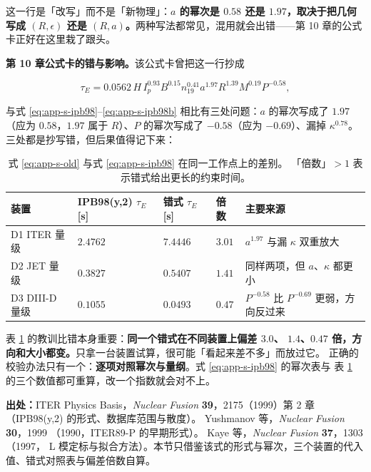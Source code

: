 这一行是「改写」而不是「新物理」：\textbf{$a$ 的幂次是 $0.58$ 还是 $1.97$，取决于把几何写成
$(R,\epsilon)$ 还是 $(R,a)$。}两种写法都常见，混用就会出错——第 10 章的公式卡正好在这里栽了跟头。

\textbf{第 10 章公式卡的错与影响。}该公式卡曾把这一行抄成

\begin{equation}
\tau_E=0.0562\,H\,I_p^{0.93}B^{0.15}n_{19}^{0.41}a^{1.97}R^{1.39}M^{0.19}P^{-0.58},
\label{eq:app-s-old}
\end{equation}

与式 \eqref{eq:app-s-ipb98}--\eqref{eq:app-s-ipb98b} 相比有三处问题：$a$ 的幂次写成了 $1.97$
（应为 $0.58$，$1.97$ 属于 $R$）、$P$ 的幂次写成了 $-0.58$（应为 $-0.69$）、漏掉 $\kappa^{0.78}$。
三处都是抄写错，但后果值得记下来：

\begin{table}[htbp]
  \centering
  \caption{式 \eqref{eq:app-s-old} 与式 \eqref{eq:app-s-ipb98} 在同一工作点上的差别。
    「倍数」$>1$ 表示错式给出更长的约束时间。}
  \label{tab:app-s-oldformula}
  \begin{tabular}{@{}p{3.0cm}p{2.6cm}p{2.6cm}p{2.4cm}p{5.0cm}@{}}
    \toprule
    装置 & IPB98(y,2) $\tau_E$ [s] & 错式 $\tau_E$ [s] & 倍数 & 主要来源 \\
    \midrule
    D1 ITER 量级 & $2.4762$ & $7.4446$ & $3.01$ & $a^{1.97}$ 与漏 $\kappa$ 双重放大 \\
    D2 JET 量级 & $0.3827$ & $0.5407$ & $1.41$ & 同样两项，但 $a$、$\kappa$ 都更小 \\
    D3 DIII-D 量级 & $0.1055$ & $0.0493$ & $0.47$ & $P^{-0.58}$ 比 $P^{-0.69}$ 更弱，方向反过来 \\
    \bottomrule
  \end{tabular}
\end{table}

表 \ref{tab:app-s-oldformula} 的教训比错本身重要：\textbf{同一个错式在不同装置上偏差 $3.0$、
$1.4$、$0.47$ 倍，方向和大小都变。}只拿一台装置试算，很可能「看起来差不多」而放过它。
正确的校验办法只有一个：\textbf{逐项对照幂次与量纲}。式 \eqref{eq:app-s-ipb98} 的幂次表与
表 \ref{tab:app-s-oldformula} 的三个数值都可重算，改一个指数就会对不上。

{\footnotesize
\textbf{出处：}ITER Physics Basis，\textit{Nuclear Fusion} \textbf{39}，2175（1999）第 2 章
（IPB98(y,2) 的形式、数据库范围与散度）。
Yushmanov 等，\textit{Nuclear Fusion} \textbf{30}，1999
（1990，ITER89-P 的早期形式）。
Kaye 等，\textit{Nuclear Fusion} \textbf{37}，1303（1997，
L 模定标与拟合方法）。本节只借鉴该式的形式与幂次，三个装置的代入值、错式对照表与偏差倍数自算。
}



